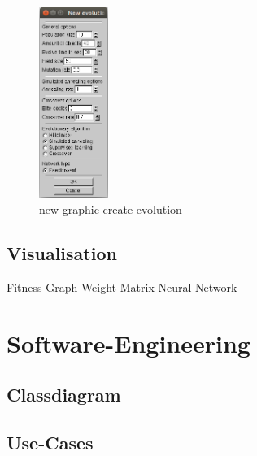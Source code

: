\documentclass[10pt,a4paper,DIV=11]{scrreprt}
\begin{document}
\begin{center}
	\begin{figure}[H]
		\centering
		\includegraphics[width=0.2\textwidth,scale=1.0]{files/new_graphic_new_ev.png}
		\caption{new graphic create evolution}
		\label{fig:cosys-transform}
	\end{figure}
\end{center}



\subsection{Visualisation}

Fitness Graph
Weight Matrix
Neural Network





\section{Software-Engineering}

\subsection{Classdiagram}

\subsection{Use-Cases}
\end{document}
